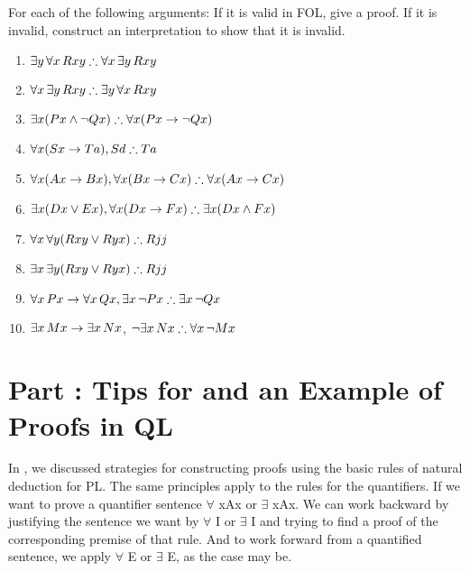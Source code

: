 \problempart
\label{pr.FOLvalidornot}
For each of the following arguments: If it is valid in FOL, give a proof. If it is invalid, construct an interpretation to show that it is invalid.
\begin{enumerate}
\item $\exists y\,\forall x\,\atom{R}{xy} \therefore \forall x\,\exists y\,\atom{R}{xy}$
\item $\forall x\,\exists y\,\atom{R}{xy} \therefore  \exists y\,\forall x\,\atom{R}{xy}$
\item $\exists x(\atom{P}{x} \eand \enot \atom{Q}{x}) \therefore \forall x(\atom{P}{x} \eif \enot \atom{Q}{x})$
\item $\forall x(\atom{S}{x} \eif \atom{T}{a}), \atom{S}{d} \therefore \atom{T}{a}$
\item $\forall x(\atom{A}{x}\eif \atom{B}{x}), \forall x(\atom{B}{x} \eif \atom{C}{x}) \therefore \forall x(\atom{A}{x} \eif \atom{C}{x})$
\item $\exists x(\atom{D}{x} \eor \atom{E}{x}), \forall x(\atom{D}{x} \eif \atom{F}{x}) \therefore \exists x(\atom{D}{x} \eand \atom{F}{x})$
\item $\forall x\,\forall y(\atom{R}{xy} \eor \atom{R}{yx}) \therefore \atom{R}{jj}$
\item $\exists x\,\exists y(\atom{R}{xy} \eor \atom{R}{yx}) \therefore \atom{R}{jj}$
\item $\forall x\,\atom{P}{x} \eif \forall x\,\atom{Q}{x}, \exists x\, \enot\atom{P}{x} \therefore \exists x\, \enot \atom{Q}{x}$
\item $\exists x\,\mathord{M}x \rightarrow \exists x\,\mathord{N}x$, $\enot \exists x\,\atom{N}{x}\therefore  \forall x\, \enot \atom{M}{x}$
\end{enumerate}



\setcounter{seccount}{1}
\chapter{Part \thechapcount: Tips for and an Example of Proofs in QL}

In , we discussed strategies for constructing proofs using the basic rules of natural deduction for PL. The same principles apply to the rules for the quantifiers. If we want to prove a quantifier sentence $\forall$ xAx or $\exists$ xAx. We can work backward by justifying the sentence we want by $\forall$ I or $\exists$ I and trying to find a proof of the corresponding premise of that rule. And to work forward from a quantified sentence, we apply $\forall$ E or $\exists$ E, as the case may be.

